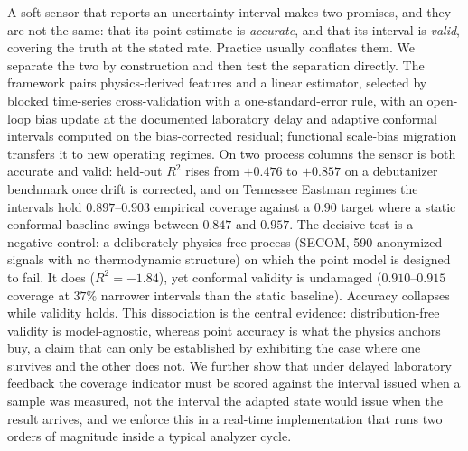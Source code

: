 A soft sensor that reports an uncertainty interval makes two promises, and they are
not the same: that its point estimate is \emph{accurate}, and that its interval is
\emph{valid}, covering the truth at the stated rate. Practice usually conflates them.
We separate the two by construction and then test the separation directly. The
framework pairs physics-derived features and a linear estimator, selected by blocked
time-series cross-validation with a one-standard-error rule, with an open-loop bias
update at the documented laboratory delay and adaptive conformal intervals computed on
the bias-corrected residual; functional scale-bias migration transfers it to new
operating regimes. On two process columns the sensor is both accurate and valid:
held-out $R^2$ rises from $+0.476$ to $+0.857$ on a debutanizer benchmark once drift
is corrected, and on Tennessee Eastman regimes the intervals hold $0.897$--$0.903$
empirical coverage against a $0.90$ target where a static conformal baseline swings
between $0.847$ and $0.957$. The decisive test is a negative control: a deliberately
physics-free process (SECOM, 590 anonymized signals with no thermodynamic structure)
on which the point model is designed to fail. It does ($R^2 = -1.84$), yet conformal
validity is undamaged ($0.910$--$0.915$ coverage at $37\%$ narrower intervals than the
static baseline). Accuracy collapses while validity holds. This dissociation is the
central evidence: distribution-free validity is model-agnostic, whereas point accuracy
is what the physics anchors buy, a claim that can only be established by exhibiting the
case where one survives and the other does not. We further show that under delayed
laboratory feedback the coverage indicator must be scored against the interval issued
when a sample was measured, not the interval the adapted state would issue when the
result arrives, and we enforce this in a real-time implementation that runs two orders
of magnitude inside a typical analyzer cycle.

